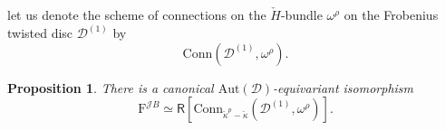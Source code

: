 \documentclass{amsart}
\newtheorem{Prop}[Thm]{Proposition}
\theoremstyle{definition}
\newcommand{\diglet}{\mathrm{F}}
\newcommand{\fr}{^\on{(1)}}
\newcommand{\D}{\sD}
\newcommand{\sD}{\mathscr{D}}
\newcommand{\on}{\mathrm}
\newcommand{\Ring}{\mathsf{R}}
\newcommand{\sP}{\mathscr{P}}
\newcommand{\Jet}{\mathscr{J}}
\newcommand{\ckappa}{\check{\kappa}}
\newcommand{\Conn}{\on{Conn}}
\newcommand{\Aut}{\on{Aut}}
\numberwithin{equation}{section}
\begin{document}

let us denote the scheme of connections on the $\check{H}$-bundle $\omega^\rho$ on the Frobenius twisted disc $\D\fr$ by 
$$\Conn(\sD\fr, \omega^\rho).$$\fi 


\begin{Prop} \label{p:digjet} There is a canonical $\Aut(\D)$-equivariant isomorphism 
$$\diglet^{\Jet B} \simeq \Ring[\Conn_{\ckappa^p - \ckappa}(\sD\fr, \omega^\rho)].$$
\end{Prop}
\end{document}
